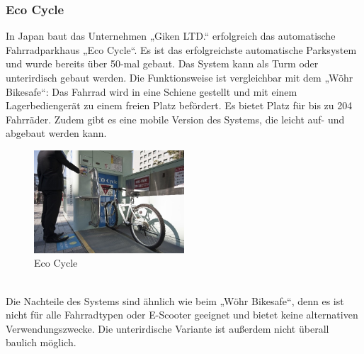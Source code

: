 \subsubsection{Eco Cycle}
In Japan baut das Unternehmen „Giken LTD.“ erfolgreich das automatische Fahrradparkhaus „Eco Cycle“. Es ist das erfolgreichste automatische Parksystem und wurde bereits über 50-mal gebaut.\cite{ginsberg_eco-cycle_2020} Das System kann als Turm oder unterirdisch gebaut werden. Die Funktionsweise ist vergleichbar mit dem „Wöhr Bikesafe“: Das Fahrrad wird in eine Schiene gestellt und mit einem Lagerbediengerät zu einem freien Platz befördert. Es bietet Platz für bis zu 204 Fahrräder.\cite*{ecocycle} Zudem gibt es eine mobile Version des Systems, die leicht auf- und abgebaut werden kann.\cite*{ecocyclemobile} \\
\begin{figure}[h]
    \centering
    \includegraphics[width=0.5\textwidth]{images/ecocycle.jpg}
    \caption{Eco Cycle \cite{cnn_japans_nodate}}
    \label{fig:ecocycle}
\end{figure}\\
Die Nachteile des Systems sind ähnlich wie beim „Wöhr Bikesafe“, denn es ist nicht für alle Fahrradtypen oder E-Scooter geeignet und bietet keine alternativen Verwendungszwecke. Die unterirdische Variante ist außerdem nicht überall baulich möglich.\\